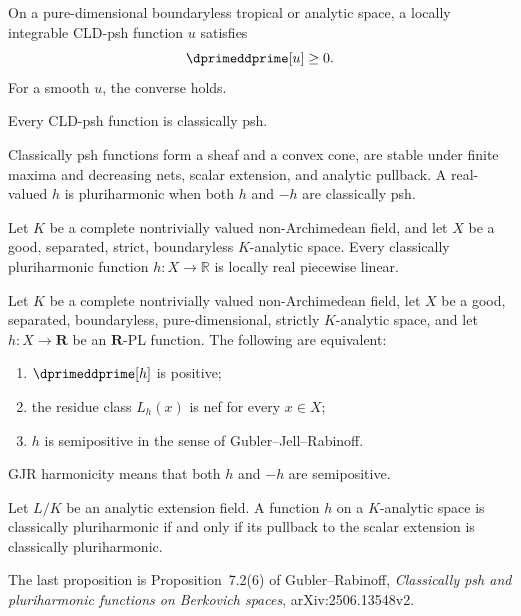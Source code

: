 
\begin{proposition}
\label{prop:cld-psh-positive-current-verifier-extract}
On a pure-dimensional boundaryless tropical or analytic space, a locally
integrable CLD-psh function $u$ satisfies
\[
                         \dprimeddprime[u]\geq0.
\]
For a smooth $u$, the converse holds.
\end{proposition}

\begin{theorem}
\label{thm:cld-to-classical-psh-verifier-extract}
Every CLD-psh function is classically psh.
\end{theorem}

\begin{proposition}
\label{prop:classical-psh-calculus-verifier-extract}
Classically psh functions form a sheaf and a convex cone, are stable under
finite maxima and decreasing nets, scalar extension, and analytic pullback.
A real-valued $h$ is pluriharmonic when both $h$ and $-h$ are classically
psh.
\end{proposition}

\begin{theorem}
\label{thm:supplied-p061-singular-pluriharmonic-verifier-extract}
Let $K$ be a complete nontrivially valued non-Archimedean field, and let
$X$ be a good, separated, strict, boundaryless $K$-analytic space.  Every
classically pluriharmonic function $h\colon X\to\mathbb R$ is locally real
piecewise linear.
\end{theorem}

\begin{theorem}
\label{thm:p01-real-pl-positive-current-verifier-extract}
Let $K$ be a complete nontrivially valued non-Archimedean field, let $X$
be a good, separated, boundaryless, pure-dimensional, strictly
$K$-analytic space, and let $h\colon X\to\mathbf R$ be an $\mathbf R$-PL
function.  The following are equivalent:
\begin{enumerate}
\item $\dprimeddprime[h]$ is positive;
\item the residue class $L_h(x)$ is nef for every $x\in X$;
\item $h$ is semipositive in the sense of Gubler--Jell--Rabinoff.
\end{enumerate}
GJR harmonicity means that both $h$ and $-h$ are semipositive.
\end{theorem}

\begin{proposition}
\label{prop:gr-scalar-pluriharmonic-verifier-extract}
Let $L/K$ be an analytic extension field.  A function $h$ on a
$K$-analytic space is classically pluriharmonic if and only if its pullback
to the scalar extension is classically pluriharmonic.
\end{proposition}

The last proposition is Proposition~7.2(6) of Gubler--Rabinoff,
\emph{Classically psh and pluriharmonic functions on Berkovich spaces},
arXiv:2506.13548v2.
